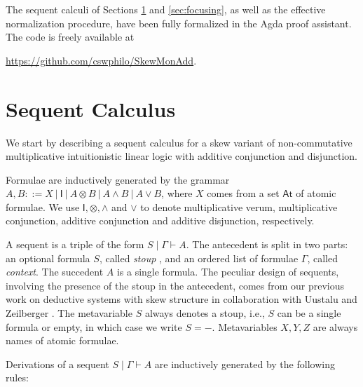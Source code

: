 \documentclass[submission,copyright,creativecommons]{eptcs}
\theoremstyle{definition}
\newcommand{\ot}{\otimes}
\newcommand{\I}{\mathsf{I}}
\begin{document}
The sequent calculi of Sections \ref{sec:sequent-calculus} and \ref{sec:focusing}, as well as the effective normalization procedure, have been fully formalized in the Agda proof assistant. The code is freely available at
\begin{center}
  \url{https://github.com/cswphilo/SkewMonAdd}.
\end{center}

\section{Sequent Calculus}\label{sec:sequent-calculus}
We start by describing a sequent calculus for a skew variant of non-commutative multiplicative intuitionistic linear logic with additive conjunction and disjunction.

Formulae are inductively generated by the grammar $A,B ::= X \ | \ \I \ | \ A \ot B \ | \ A \land B \ | \ A \lor B$, where $X$ comes from a set $\mathsf{At}$ of atomic formulae. 
We use $\I , \ot , \land$ and $\lor$ to denote multiplicative verum, multiplicative conjunction, additive conjunction and additive disjunction, respectively.

A sequent is a triple of the form $S \mid \Gamma \vdash A$.
The antecedent is split in two parts: an optional formula $S$, called \emph{stoup} \cite{girard:constructive:91}, and an ordered list of formulae $\Gamma$, called \emph{context}.
The succedent $A$ is a single formula.
The peculiar design of sequents, involving the presence of the stoup in the antecedent, comes from our previous work on deductive systems with skew structure in collaboration with Uustalu and Zeilberger \cite{uustalu:sequent:2021,uustalu:proof:nodate,uustalu:deductive:nodate,veltri:coherence:2021,UVW:protsn}.
The metavariable $S$ always denotes a stoup, i.e., $S$ can be a single formula or empty, in which case we write $S = {-}$. Metavariables $X,Y,Z$ are always names of atomic formulae.

Derivations of a sequent $S \mid \Gamma \vdash A$ are inductively generated by the following rules:
\end{document}

